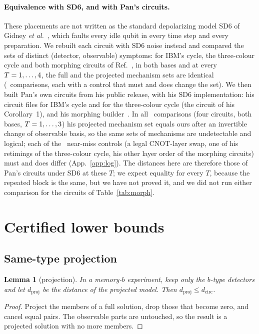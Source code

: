 \documentclass[aps,pra,twocolumn,superscriptaddress,nofootinbib,longbibliography,floatfix]{revtex4-2}
\newtheorem{lemma}{Lemma}
\newcommand{\dc}{d_{\mathrm{circ}}}
\newcommand{\dproj}{d_{\mathrm{proj}}}
\begin{document}
\paragraph*{Equivalence with SD6, and with Pan's circuits.} These placements are not written as the standard depolarizing model SD6 of Gidney \textit{et al.}~\cite{gidney2021honeycomb}, which faults every idle qubit in every time step and every preparation. We rebuilt each circuit with SD6 noise instead and compared the sets of distinct (detector, observable) symptoms: for IBM's cycle, the three-colour cycle and both morphing circuits of Ref.~\cite{shaw2024lowering}, in both bases and at every $T=1,\dots,4$, the full and the projected mechanism sets are identical (\SdSixRows\ comparisons, each with a control that must and does change the set). We then built Pan's own circuits from his public release, with his SD6 implementation: his circuit files for IBM's cycle and for the three-colour cycle (the circuit of his Corollary~1), and his morphing builder~\cite{pan2026e017}. In all \PanXRows\ comparisons (four circuits, both bases, $T=1,\dots,3$) his projected mechanism set equals ours after an invertible change of observable basis, so the same sets of mechanisms are undetectable and logical; each of the \PanXControls\ near-miss controls (a legal CNOT-layer swap, one of his retimings of the three-colour cycle, his other layer order of the morphing circuits) must and does differ (App.~\ref{app:log}). The distances here are therefore those of Pan's circuits under SD6 at these $T$; we expect equality for every $T$, because the repeated block is the same, but we have not proved it, and we did not run either comparison for the circuits of Table~\ref{tab:morph}.

\section{Certified lower bounds}
\label{sec:search}

\subsection{Same-type projection}

\begin{lemma}[projection]
In a memory-$b$ experiment, keep only the $b$-type detectors and let $\dproj$ be the distance of the projected model. Then $\dproj\le\dc$.
\end{lemma}
\begin{proof}
Project the members of a full solution, drop those that become zero, and cancel equal pairs. The observable parts are untouched, so the result is a projected solution with no more members.
\end{proof}
\end{document}

